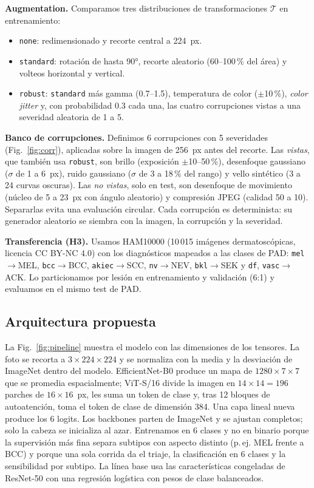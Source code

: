\documentclass[conference]{IEEEtran}
\begin{document}
\textbf{Augmentation.} Comparamos tres distribuciones de transformaciones $\mathcal{T}$ en entrenamiento:
\begin{itemize}
\item \texttt{none}: redimensionado y recorte central a 224~px.
\item \texttt{standard}: rotación de hasta 90°, recorte aleatorio (60--100\,\% del área) y volteos horizontal y vertical.
\item \texttt{robust}: \texttt{standard} más gamma (0.7--1.5), temperatura de color ($\pm$10\,\%), \textit{color jitter} y, con probabilidad 0.3 cada una, las cuatro corrupciones vistas a una severidad aleatoria de 1 a 5.
\end{itemize}

\textbf{Banco de corrupciones.} Definimos 6 corrupciones con 5 severidades (Fig.~\ref{fig:corr}), aplicadas sobre la imagen de 256~px antes del recorte. Las \emph{vistas}, que también usa \texttt{robust}, son brillo (exposición $\pm$10--50\,\%), desenfoque gaussiano ($\sigma$ de 1 a 6~px), ruido gaussiano ($\sigma$ de 3 a 18\,\% del rango) y vello sintético (3 a 24 curvas oscuras). Las \emph{no vistas}, solo en test, son desenfoque de movimiento (núcleo de 5 a 23~px con ángulo aleatorio) y compresión JPEG (calidad 50 a 10). Separarlas evita una evaluación circular. Cada corrupción es determinista: su generador aleatorio se siembra con la imagen, la corrupción y la severidad.

\textbf{Transferencia (H3).} Usamos HAM10000 \cite{tschandl2018} (10\,015 imágenes dermatoscópicas, licencia CC BY-NC 4.0) con los diagnósticos mapeados a las clases de PAD: \texttt{mel}$\to$MEL, \texttt{bcc}$\to$BCC, \texttt{akiec}$\to$SCC, \texttt{nv}$\to$NEV, \texttt{bkl}$\to$SEK y \texttt{df}, \texttt{vasc}$\to$ACK. Lo particionamos por lesión en entrenamiento y validación (6:1) y evaluamos en el mismo test de PAD.

\subsection{Arquitectura propuesta}
La Fig.~\ref{fig:pipeline} muestra el modelo con las dimensiones de los tensores. La foto se recorta a $3\times224\times224$ y se normaliza con la media y la desviación de ImageNet dentro del modelo. EfficientNet-B0 produce un mapa de $1280\times7\times7$ que se promedia espacialmente; ViT-S/16 divide la imagen en $14\times14=196$ parches de $16\times16$~px, les suma un token de clase y, tras 12 bloques de autoatención, toma el token de clase de dimensión 384. Una capa lineal nueva produce los 6 logits. Los backbones parten de ImageNet y se ajustan completos; solo la cabeza se inicializa al azar. Entrenamos en 6 clases y no en binario porque la supervisión más fina separa subtipos con aspecto distinto (p.\,ej. MEL frente a BCC) y porque una sola corrida da el triaje, la clasificación en 6 clases y la sensibilidad por subtipo. La línea base usa las características congeladas de ResNet-50 \cite{he2016} con una regresión logística con pesos de clase balanceados.
\end{document}
